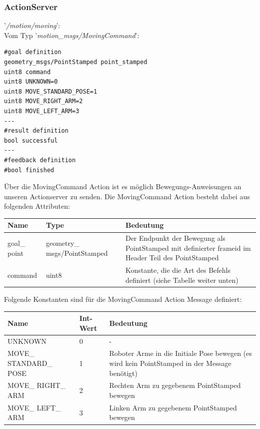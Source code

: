 \documentclass{suturo}
\begin{document}
\subsubsection{ActionServer}
'\textit{/motion/moving}': \\
Vom Typ '\textit{motion\_msgs/MovingCommand}': \\
\begin{lstlisting}[caption={Definition der MovingCommandAction},captionpos=b]
#goal definition
geometry_msgs/PointStamped point_stamped
uint8 command
uint8 UNKNOWN=0
uint8 MOVE_STANDARD_POSE=1
uint8 MOVE_RIGHT_ARM=2
uint8 MOVE_LEFT_ARM=3
---
#result definition
bool successful
---
#feedback definition
#bool finished
\end{lstlisting}

\newpage
Über die MovingCommand Action ist es möglich Bewegungs-Anweisungen an unseren Actionserver zu senden. Die MovingCommand Action besteht dabei aus folgenden Attributen:
\begin{center}
	\begin{tabular}{ l | l | p{7cm}}
		Name & Type & Bedeutung \\ \hline
		goal\_ point & geometry\_ msgs/PointStamped & Der Endpunkt der Bewegung als PointStamped mit definierter frameid im Header Teil des PointStamped \\ \hline
		command & uint8 & Konstante, die die Art des Befehls definiert (siehe Tabelle weiter unten) \\
	\end{tabular}
\end{center}
  
Folgende Konstanten sind für die MovingCommand Action Message definiert:

\begin{center}
	\begin{tabular}{ l | l | p{7cm}}
		Name & Int-Wert & Bedeutung \\ \hline
		UNKNOWN & 0 & - \\ \hline
		MOVE\_ STANDARD\_ POSE & 1 & Roboter Arme in die Initiale Pose bewegen (es wird kein PointStamped in der Message benötigt) \\ \hline
		MOVE\_ RIGHT\_ ARM & 2 & Rechten Arm zu gegebenem PointStamped bewegen \\ \hline
		MOVE\_ LEFT\_ ARM & 3 & Linken Arm zu gegebenem PointStamped bewegen \\
	\end{tabular}
\end{center}
\end{document}
